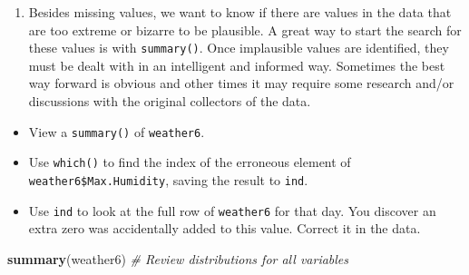 \documentclass[]{article}
\newenvironment{Shaded}{\begin{snugshade}}{\end{snugshade}}
\newcommand{\KeywordTok}[1]{\textcolor[rgb]{0.13,0.29,0.53}{\textbf{#1}}}
\newcommand{\CommentTok}[1]{\textcolor[rgb]{0.56,0.35,0.01}{\textit{#1}}}
\newcommand{\NormalTok}[1]{#1}
\providecommand{\tightlist}{%
  \setlength{\itemsep}{0pt}\setlength{\parskip}{0pt}}
\begin{document}
\begin{enumerate}
\def\labelenumi{\arabic{enumi}.}
\setcounter{enumi}{8}
\tightlist
\item
  Besides missing values, we want to know if there are values in the
  data that are too extreme or bizarre to be plausible. A great way to
  start the search for these values is with \texttt{summary()}. Once
  implausible values are identified, they must be dealt with in an
  intelligent and informed way. Sometimes the best way forward is
  obvious and other times it may require some research and/or
  discussions with the original collectors of the data.
\end{enumerate}

\begin{itemize}
\item
  View a \texttt{summary()} of \texttt{weather6}.
\item
  Use \texttt{which()} to find the index of the erroneous element of
  \texttt{weather6\$Max.Humidity}, saving the result to \texttt{ind}.
\item
  Use \texttt{ind} to look at the full row of \texttt{weather6} for that
  day. You discover an extra zero was accidentally added to this value.
  Correct it in the data.
\end{itemize}

\begin{Shaded}
\begin{Highlighting}[]
\KeywordTok{summary}\NormalTok{(weather6) }\CommentTok{# Review distributions for all variables}
\end{Highlighting}
\end{Shaded}
\end{document}
